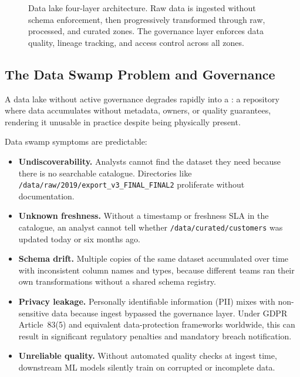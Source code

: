 \begin{figure}[htbp]
\caption{Data lake four-layer architecture. Raw data is ingested without
         schema enforcement, then progressively transformed through raw,
         processed, and curated zones. The governance layer enforces data
         quality, lineage tracking, and access control across all zones.}
\label{fig:data-lake}
\end{figure}

\subsection{The Data Swamp Problem and Governance}
\label{subsec:data-swamp}

A data lake without active governance degrades rapidly into a
: a repository where data accumulates without metadata,
owners, or quality guarantees, rendering it unusable in practice despite
being physically present.

Data swamp symptoms are predictable:
\begin{itemize}
  \item \textbf{Undiscoverability.} Analysts cannot find the dataset
        they need because there is no searchable catalogue. Directories
        like \texttt{/data/raw/2019/export\_v3\_FINAL\_FINAL2} proliferate
        without documentation.
  \item \textbf{Unknown freshness.} Without a timestamp or freshness
        SLA in the catalogue, an analyst cannot tell whether
        \texttt{/data/curated/customers} was updated today or six months ago.
  \item \textbf{Schema drift.} Multiple copies of the same dataset
        accumulated over time with inconsistent column names and types,
        because different teams ran their own transformations without
        a shared schema registry.
  \item \textbf{Privacy leakage.} Personally identifiable information
        (PII) mixes with non-sensitive data because ingest bypassed
        the governance layer. Under GDPR Article~83(5) and equivalent
        data-protection frameworks worldwide, this can result in
        significant regulatory penalties and mandatory breach notification.
  \item \textbf{Unreliable quality.} Without automated quality checks
        at ingest time, downstream ML models silently train on corrupted
        or incomplete data.
\end{itemize}

